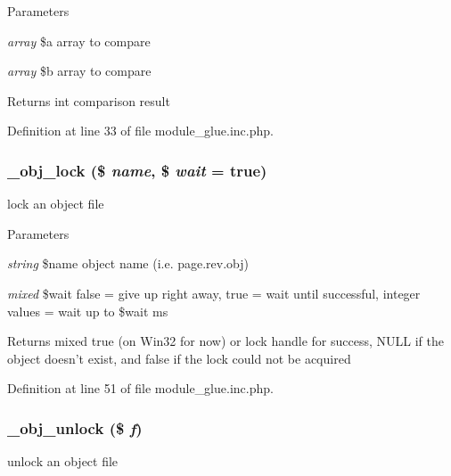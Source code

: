 \begin{DoxyParams}{Parameters}
\item[{\em array}]\$a array to compare \item[{\em array}]\$b array to compare \end{DoxyParams}
\begin{DoxyReturn}{Returns}
int comparison result 
\end{DoxyReturn}


Definition at line 33 of file module\_\-glue.inc.php.

\hypertarget{module__glue_8inc_8php_a21f260355b875069ca90edf1f9a559d0}{
\subsubsection[{\_\-obj\_\-lock}]{\setlength{\rightskip}{0pt plus 5cm}\_\-obj\_\-lock (\$ {\em name}, \/  \$ {\em wait} = {\ttfamily true})}}
\label{module__glue_8inc_8php_a21f260355b875069ca90edf1f9a559d0}
lock an object file


\begin{DoxyParams}{Parameters}
\item[{\em string}]\$name object name (i.e. page.rev.obj) \item[{\em mixed}]\$wait false = give up right away, true = wait until successful, integer values = wait up to \$wait ms \end{DoxyParams}
\begin{DoxyReturn}{Returns}
mixed true (on Win32 for now) or lock handle for success, NULL if the object doesn't exist, and false if the lock could not be acquired 
\end{DoxyReturn}


Definition at line 51 of file module\_\-glue.inc.php.

\hypertarget{module__glue_8inc_8php_a73a91facde5362e20df9657d31c2bb06}{
\subsubsection[{\_\-obj\_\-unlock}]{\setlength{\rightskip}{0pt plus 5cm}\_\-obj\_\-unlock (\$ {\em f})}}
\label{module__glue_8inc_8php_a73a91facde5362e20df9657d31c2bb06}
unlock an object file


